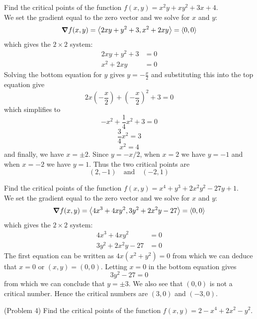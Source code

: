 \documentclass[handout]{ximera}
\begin{document}
\begin{example}[Example 3]
Find the critical points of the function $f(x,y) = x^2y +xy^2 +3x + 4$.\\
We set the gradient equal to the zero vector and we solve for $x$ and $y$:
\[
\boldsymbol\nabla f(x,y) = \left\langle 2xy + y^2 + 3, x^2 + 2xy\right\rangle = \left\langle 0,0\right\rangle
\]
which gives the $2 \times 2$ system:
\begin{align*}
2xy + y^2 +3  &= 0\\
x^2 + 2xy & = 0
\end{align*}
Solving the bottom equation for $y$ gives $y = -\frac{x}{2}$ and substituting this into the top equation give
\[
2x\left(-\frac{x}{2}\right) + \left(-\frac{x}{2}\right)^2 +3 = 0
\]
which simplifies to
\[
-x^2 + \frac14 x^2 + 3 =0
\]
\[
\frac34 x^2 = 3
\]
\[
x^2 = 4
\]
and finally, we have $x=\pm 2$. Since $y = -x/2$, when $x=2$ we have $y=-1$ and when $x = -2$ we have $y = 1$.
Thus the two critical points are
\[
(2,-1) \quad \text{and} \quad (-2, 1)
\]
\end{example}

\begin{example}[Example 4]
Find the critical points of the function $f(x,y) = x^4 + y^3 + 2x^2y^2 -27y + 1$.\\
We set the gradient equal to the zero vector and we solve for $x$ and $y$:
\[
\boldsymbol\nabla f(x,y) = \left\langle 4x^3 + 4xy^2, 3y^2 + 2x^2y -27\right\rangle = \left\langle 0,0\right\rangle
\]
which gives the $2 \times 2$ system:
\begin{align*}
4x^3 + 4xy^2 &= 0\\
3y^2 + 2x^2y -27& = 0
\end{align*}
The first equation can be written as $4x(x^2 + y^2) = 0$ from which we can deduce that $x = 0$ or $(x, y) = (0,0)$. Letting $x = 0$ in the bottom equation gives
\[
3y^2 - 27 = 0
\]
from which we can conclude that $y = \pm 3$. We also see that $(0,0)$ is not a critical number.
Hence the critical numbers are $(3,0)$ and $(-3,0)$.
\end{example}

\begin{problem}(Problem 4)
Find the critical points of the function $f(x,y) = 2-x^4 + 2x^2 - y^2$.
\end{problem}
\end{document}
